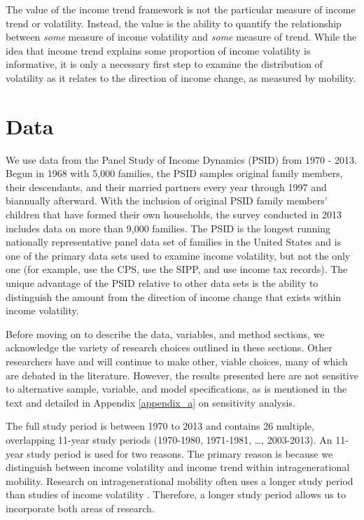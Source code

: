 \documentclass[12pt]{article}
\begin{document}
The value of the income trend framework is not the particular measure of income trend or volatility. Instead, the value is the ability to quantify the relationship between \emph{some} measure of income volatility and \emph{some} measure of trend. While the idea that income trend explains some proportion of income volatility is informative, it is only a necessary first step to examine the distribution of volatility as it relates to the direction of income change, as measured by mobility.

\section{Data}

We use data from the Panel Study of Income Dynamics (PSID) from 1970 - 2013. Begun in 1968 with 5,000 families, the PSID samples original family members, their descendants, and their married partners every year through 1997 and biannually afterward. With the inclusion of original PSID family members' children that have formed their own households, the survey conducted in 2013 includes data on more than 9,000 families. The PSID is the longest running nationally representative panel data set of families in the United States and is one of the primary data sets used to examine income volatility, but not the only one (for example, \citealp{hardy_ziliak_2014} use the CPS, \citealp{bania_leete_2009} use the SIPP, and \citealp{dahl_etal_2011} use income tax records). The unique advantage of the PSID relative to other data sets is the ability to distinguish the amount from the direction of income change that exists within income volatility.

Before moving on to describe the data, variables, and method sections, we acknowledge the variety of research choices outlined in these sections. Other researchers have and will continue to make other, viable choices, many of which are debated in the literature. However, the results presented here are not sensitive to alternative sample, variable, and model specifications, as is mentioned in the text and detailed in Appendix \ref{appendix_a} on sensitivity analysis. 

The full study period is between 1970 to 2013 and contains 26 multiple, overlapping 11-year study periods (1970-1980, 1971-1981, \dots , 2003-2013). An 11-year study period is used for two reasons. The primary reason is because we distinguish between income volatility and income trend within intragenerational mobility. Research on intragenerational mobility often uses a longer study period than studies of income volatility \citep{gittleman_joyce_1999,burkhauser_couch_2009,bradbury_2011}. Therefore, a longer study period allows us to incorporate both areas of research.
\end{document}
